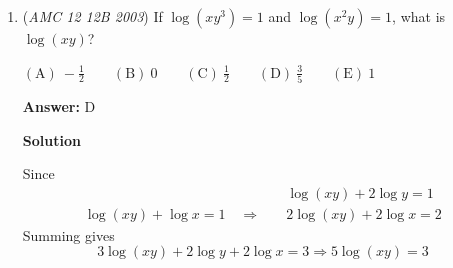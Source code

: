 \begin{enumerate}
 The other two have areas of $\frac{180-60}{360}=\frac{1}{3}$ of a triangle each.

 Therefore, the total fraction of the circle(since they have the same radii) is $\frac{1}{6} + 2 \cdot \frac{1}{3} = \frac{1}{6} + \frac{4}{6} = \frac{5}{6}.$




\textbf{Solution 2(Answer Choices)}

Answer choices A and B are impossible since the area is obviously not a circle of radius 1 minus a triangle.

 Answer choices C and D are also impossible since they are adding but we are subtracting.

 That leaves us with only answer choice $\textbf{(E)}.$




\textbf{Solution 3 ( Circle area formulas )}

We can see that the area of the $3$ overlapped white semi circles is equal to :

 $2*\frac{1}{2}\pi+\frac{1}{2}*\frac{\pi}{3}-2*\frac{1}{2}\left(\frac{\pi}{3} -\ \frac{\sqrt{3}}{2}\right)$

 We get this because we think of the 2 overlapped circles on the side as 2 full semi circles then adding the area of the sector in between but subtracting the area segments of the 2 semi circles out (So that they don't overlap). Now by using the formulas:

 Area of sector $=\frac{1}{2}r^2*\text{sin}\theta$

 Area of segment $=\frac{1}{2}r^2\left( \theta -\ \text{sin}\theta\right)$

 ($\theta$ is in radians)

 and so we get :

 $=\frac{5}{6}\pi+\frac{\sqrt3}{2}$

 then the solution is the same as in solution 1.

 


	\item (\textit{AMC 12 12B 2003}) If $\log (xy^3) = 1$ and $\log (x^2y) = 1$, what is $\log (xy)$?


 $\mathrm{(A)}\ -\frac 12  \qquad\mathrm{(B)}\ 0  \qquad\mathrm{(C)}\ \frac 12 \qquad\mathrm{(D)}\ \frac 35  \qquad\mathrm{(E)}\ 1$

 \textbf{Answer: }D



\textbf{Solution}

Since 
 \begin{align*} &\log(xy) +2\log y = 1  \\ \log(xy) + \log x = 1 \quad \Longrightarrow \quad &2\log(xy) + 2\log x = 2 \end{align*}
Summing gives 
 \[3\log(xy) + 2\log y + 2\log x = 3 \Longrightarrow 5\log(xy) = 3\]


\end{enumerate}
